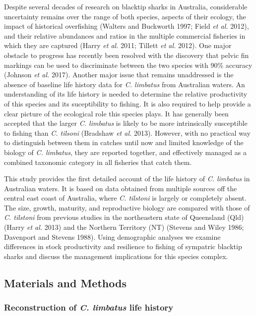 \documentclass[]{article}
\begin{document}
Despite several decades of research on blacktip sharks in Australia,
considerable uncertainty remains over the range of both species, aspects
of their ecology, the impact of historical overfishing (Walters and
Buckworth 1997; Field \emph{et al.} 2012), and their relative abundances
and ratios in the multiple commercial fisheries in which they are
captured (Harry \emph{et al.} 2011; Tillett \emph{et al.} 2012). One
major obstacle to progress has recently been resolved with the discovery
that pelvic fin markings can be used to discriminate between the two
species with 90\% accuracy (Johnson \emph{et al.} 2017). Another major
issue that remains unaddressed is the absence of baseline life history
data for \emph{C. limbatus} from Australian waters. An understanding of
its life history is needed to determine the relative productivity of
this species and its suceptibility to fishing. It is also required to
help provide a clear picture of the ecological role this species plays.
It has generally been accepted that the larger \emph{C. limbatus} is
likely to be more intrinsically susceptible to fishing than \emph{C.
tilsoni} (Bradshaw \emph{et al.} 2013). However, with no practical way
to distinguish between them in catches until now and limited knowledge
of the biology of \emph{C. limbatus}, they are reported together, and
effectively managed as a combined taxonomic category in all fisheries
that catch them.

This study provides the first detailed account of the life history of
\emph{C. limbatus} in Australian waters. It is based on data obtained
from multiple sources off the central east coast of Australia, where
\emph{C. tilstoni} is largely or completely absent. The size, growth,
maturity, and reproductive biology are compared with those of \emph{C.
tilstoni} from previous studies in the northeastern state of Queensland
(Qld) (Harry \emph{et al.} 2013) and the Northern Territory (NT)
(Stevens and Wiley 1986; Davenport and Stevens 1988). Using demographic
analyses we examine differences in stock productivity and resilience to
fishing of sympatric blacktip sharks and discuss the management
implications for this species complex.

\subsection{Materials and Methods}\label{materials-and-methods}

\subsubsection{\texorpdfstring{Reconstruction of \emph{C. limbatus} life
history}{Reconstruction of C. limbatus life history}}\label{reconstruction-of-c.-limbatus-life-history}
\end{document}
